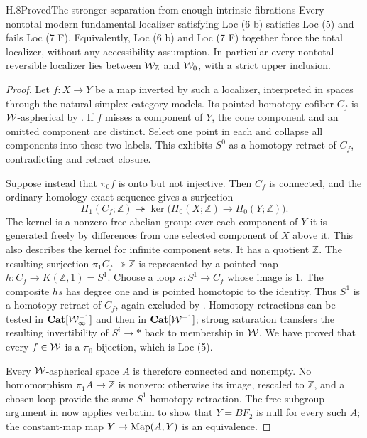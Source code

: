 \begin{claim}{H.8}{Proved}{The stronger separation from enough intrinsic fibrations}
Every nontotal modern fundamental localizer satisfying Loc (6 b) satisfies Loc (5) and fails Loc (7 F). Equivalently, Loc (6 b) and Loc (7 F) together force the total localizer, without any accessibility assumption. In particular every nontotal reversible localizer lies between $\mathcal{W}_{\mathbb Z}$ and $\mathcal{W}_0$, with a strict upper inclusion.
\end{claim}
\begin{proof}
Let $f:X\to Y$ be a map inverted by such a localizer, interpreted in spaces through the natural simplex-category models. Its pointed homotopy cofiber $C_f$ is $\mathcal{W}$-aspherical by . If $f$ misses a component of $Y$, the cone component and an omitted component are distinct. Select one point in each and collapse all components into these two labels. This exhibits $S^0$ as a homotopy retract of $C_f$, contradicting  and retract closure.

Suppose instead that $\pi_0f$ is onto but not injective. Then $C_f$ is connected, and the ordinary homology exact sequence gives a surjection
\[
 H_1(C_f;\mathbb Z)\twoheadrightarrow
 \ker\bigl(H_0(X;\mathbb Z)\to H_0(Y;\mathbb Z)\bigr).
\]
The kernel is a nonzero free abelian group: over each component of $Y$ it is generated freely by differences from one selected component of $X$ above it. This also describes the kernel for infinite component sets. It has a quotient $\mathbb Z$. The resulting surjection $\pi_1C_f\twoheadrightarrow\mathbb Z$ is represented by a pointed map $h:C_f\to K(\mathbb Z,1)=S^1$. Choose a loop $s:S^1\to C_f$ whose image is $1$. The composite $hs$ has degree one and is pointed homotopic to the identity. Thus $S^1$ is a homotopy retract of $C_f$, again excluded by . Homotopy retractions can be tested in $\mathbf{Cat}[\mathcal{W}_{\infty}^{-1}]$ and then in $\mathbf{Cat}[\mathcal{W}^{-1}]$; strong saturation  transfers the resulting invertibility of $S^i\to *$ back to membership in $\mathcal{W}$. We have proved that every $f\in\mathcal{W}$ is a $\pi_0$-bijection, which is Loc (5).

Every $\mathcal{W}$-aspherical space $A$ is therefore connected and nonempty. No homomorphism $\pi_1A\to\mathbb Z$ is nonzero: otherwise its image, rescaled to $\mathbb Z$, and a chosen loop provide the same $S^1$ homotopy retraction. The free-subgroup argument in  now applies verbatim to show that $Y=BF_2$ is null for every such $A$; the constant-map map $Y\to\operatorname{Map}(A,Y)$ is an equivalence.


\end{proof}
